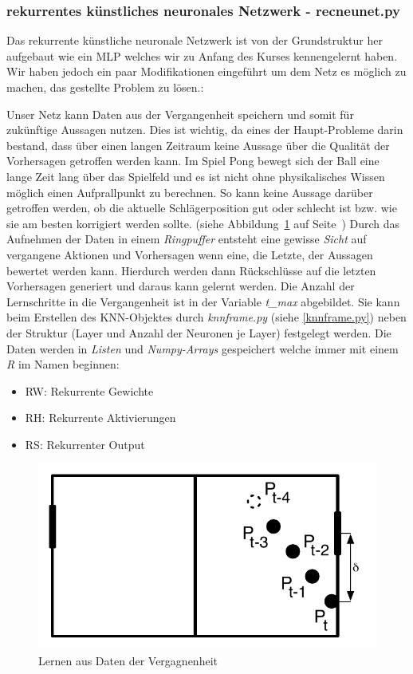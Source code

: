 \documentclass[12pt,twoside]{article}
\theoremstyle{plain}
\theoremstyle{definition}
\theoremstyle{remark}
\begin{document}
\subsubsection{rekurrentes künstliches neuronales Netzwerk - recneunet.py}
\label{recneunet.py}

Das rekurrente künstliche neuronale Netzwerk ist von der Grundstruktur her aufgebaut wie ein MLP welches wir zu Anfang des Kurses kennengelernt haben. Wir haben jedoch ein paar Modifikationen eingeführt um dem Netz es möglich zu machen, das gestellte Problem zu lösen.:

Unser Netz kann Daten aus der Vergangenheit speichern und somit für zukünftige Aussagen nutzen. Dies ist wichtig, da eines der Haupt-Probleme darin bestand, dass über einen langen Zeitraum keine Aussage über die Qualität der Vorhersagen getroffen werden kann. Im Spiel Pong bewegt sich der Ball eine lange Zeit lang über das Spielfeld und es ist nicht ohne physikalisches Wissen möglich einen Aufprallpunkt zu berechnen. So kann keine Aussage darüber getroffen werden, ob die aktuelle Schlägerposition gut oder schlecht ist bzw. wie sie am besten korrigiert werden sollte. (siehe Abbildung~\ref{fig:delayedlearning} auf Seite~\pageref{fig:delayedlearning})
Durch das Aufnehmen der Daten in einem \textit{Ringpuffer} entsteht eine gewisse \textit{Sicht} auf vergangene Aktionen und Vorhersagen wenn eine, die Letzte, der Aussagen bewertet werden kann. Hierdurch werden dann Rückschlüsse auf die letzten Vorhersagen generiert und daraus kann gelernt werden. Die Anzahl der Lernschritte in die Vergangenheit ist in der Variable \textit{t\_max} abgebildet. Sie kann beim Erstellen des KNN-Objektes durch \textit{knnframe.py} (siehe \ref{knnframe.py}) neben der Struktur (Layer und Anzahl der Neuronen je Layer) festgelegt werden. 
Die Daten werden in \textit{Listen} und \textit{Numpy-Arrays} gespeichert welche immer mit einem \textit{R} im Namen beginnen:
\begin{itemize}
  \item RW: Rekurrente Gewichte
  \item RH: Rekurrente Aktivierungen
  \item RS: Rekurrenter Output
\end{itemize}

\begin{figure}[hbtp]
	 \centerline{\includegraphics[]{delayed.pdf}}
	 {\caption{Lernen aus Daten der Vergagnenheit}\label{fig:delayedlearning}}
\end{figure}
\end{document}

